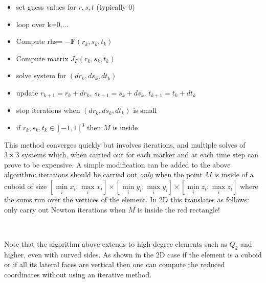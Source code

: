 \begin{itemize}
\item set guess values for $r,s,t$ (typically 0)
\item loop over k=0,...
\item Compute rhs= $-{\bm F}(r_k,s_k,t_k)$ 
\item Compute matrix $J_F(r_k,s_k,t_k)$
\item solve system for $(dr_k,ds_k,dt_k)$
\item update $r_{k+1}=r_k+dr_k$, $s_{k+1}=s_k+ds_k$, $t_{k+1}=t_k+dt_k$ 
\item stop iterations when $(dr_k,ds_k,dt_k)$ is small
\item if $r_k,s_k,t_k\in[-1,1]^3$ then $M$ is inside.
\end{itemize}
This method converges quickly but involves iterations, and multiple solves of $3\times 3$ systems which, 
when carried out for each marker and at each time step can prove to be expensive. 
A simple modification can be added to the above algorithm: iterations should be carried out {\it only}
when the point $M$ is inside of a cuboid of size $[\min\limits_i{x_i}:\max\limits_i{x_i}]\times[\min\limits_i{y_i}:\max\limits_i{y_i} ]
\times[\min\limits_i{z_i}:\max\limits_i{z_i}]$ where the sums run over the vertices of the element. 
In 2D this translates as follows: only carry out Newton iterations when $M$ is inside the red rectangle!
\begin{center}
\\
\end{center}

Note that the algorithm above extends to high degree elements such as $Q_2$ and higher, even with curved sides.
As shown in the 2D case if the element is a cuboid or if all its lateral faces are vertical then one can 
compute the reduced coordinates without using an iterative method.



